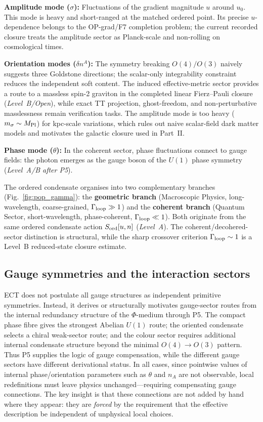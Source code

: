 \documentclass[11pt,a4paper]{article}
\begin{document}
\textbf{Amplitude mode ($\sigma$):} Fluctuations of the gradient magnitude $u$ around $u_0$. This mode is heavy and short-ranged at the matched ordered point. Its precise \(u\)-dependence belongs to the OP-grad/F7 completion problem; the current recorded closure treats the amplitude sector as Planck-scale and non-rolling on cosmological times.

\textbf{Orientation modes ($\delta n^A$):} The symmetry breaking $O(4)/O(3)$ naively suggests three Goldstone directions; the scalar-only integrability constraint reduces the independent soft content. The induced effective-metric sector provides a route to a massless spin-2 graviton in the completed linear Fierz--Pauli closure (\emph{Level~B/Open}), while exact TT projection, ghost-freedom, and non-perturbative masslessness remain verification tasks. The amplitude mode is too heavy ($m_\sigma\sim M_{\rm Pl}$) for kpc-scale variations, which rules out naive scalar-field dark matter models and motivates the galactic closure used in Part~II.

\textbf{Phase mode ($\theta$):} In the coherent sector, phase fluctuations connect to gauge fields: the photon emerges as the gauge boson of the $U(1)$ phase symmetry (\emph{Level~A/B after P5}).

The ordered condensate organises into two complementary branches (Fig.~\ref{fig:pop_gamma}): the \textbf{geometric branch} (Macroscopic Physics, long-wavelength, coarse-grained, $\Gamma_{\rm loop} \gg 1$) and the \textbf{coherent branch} (Quantum Sector, short-wavelength, phase-coherent, $\Gamma_{\rm loop} \ll 1$). Both originate from the same ordered condensate action $S_{\rm ord}[u, n]$ (\emph{Level~A}). The coherent/decohered-sector distinction is structural, while the sharp crossover criterion $\Gamma_{\rm loop} \sim 1$ is a Level~B reduced-state closure estimate.

\subsection{Gauge symmetries and the interaction sectors}
\label{sec:pop_gauge}

ECT does not postulate all gauge structures as independent primitive symmetries. Instead, it derives or structurally motivates gauge-sector routes from the internal redundancy structure of the $\Phi$-medium through P5. The compact phase fibre gives the strongest Abelian $U(1)$ route; the oriented condensate selects a chiral weak-sector route; and the colour sector requires additional internal condensate structure beyond the minimal $O(4)\to O(3)$ pattern. Thus P5 supplies the logic of gauge compensation, while the different gauge sectors have different derivational status. In all cases, since pointwise values of internal phase/orientation parameters such as $\theta$ and $n_A$ are not observable, local redefinitions must leave physics unchanged---requiring compensating gauge connections. The key insight is that these connections are not added by hand where they appear: they are \emph{forced} by the requirement that the effective description be independent of unphysical local choices.
\end{document}
